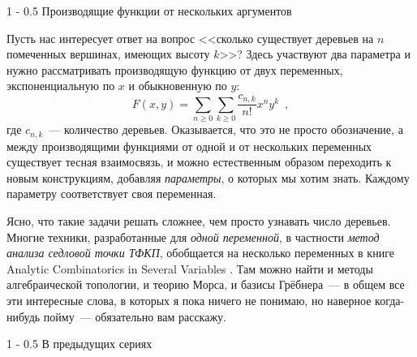 \documentclass{article}
\makeatletter
\theoremstyle{definition}
\renewcommand{\section}{\@startsection
{section}%
{1}%
{\z@}%
{-\baselineskip}%
{0.5\baselineskip}%
{\centering\large\scshape}} %
\renewcommand{\subsection}{\@startsection
{subsection}%
{1}%
{\z@}%
{-\baselineskip}%
{0.5\baselineskip}%
{\centering\large\scshape}} %
\makeatother
\begin{document}
\subsection{Производящие функции от нескольких аргументов}

Пусть нас интересует ответ на вопрос <<сколько существует деревьев на \( n \) 
помеченных вершинах, имеющих высоту \( k \)>>? Здесь участвуют два параметра и 
нужно рассматривать производящую функцию от двух переменных, экспоненциальную 
по \( x \) и обыкновенную по \( y \):
\[
	F(x, y) = \sum_{n \geq 0} \sum_{k \geq 0} \dfrac{c_{n,k}}{n!} x^n y^k 
	\enspace ,
\]
где \( c_{n,k} \)~--- количество деревьев. Оказывается, что это не просто 
обозначение, а между производящими функциями от одной и от нескольких 
переменных существует тесная взаимосвязь, и можно естественным образом 
переходить к новым конструкциям, добавляя \textit{параметры}, о которых мы 
хотим знать. Каждому параметру соответствует своя переменная.

Ясно, что такие задачи решать сложнее, чем просто узнавать число деревьев. 
Многие техники, разработанные для \textit{одной переменной}, в частности 
\textit{метод анализа седловой точки ТФКП}, обобщается на несколько переменных 
в книге Analytic Combinatorics in Several Variables \cite{acsv}. Там можно 
найти и методы алгебраической топологии, и 
теорию Морса, и базисы Грёбнера~--- в общем все эти интересные слова, в которых 
я пока ничего не понимаю, но наверное когда-нибудь пойму~--- обязательно вам 
расскажу.

\section{В предыдущих сериях}
\end{document}
